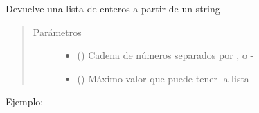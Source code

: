 \documentclass[a4paper,12pt,spanish]{sphinxmanual}
\begin{document}
\begin{fulllineitems}
\label{\detokenize{openerm.Utils:openerm.Utils.str_to_list}}
Devuelve una lista de enteros a partir de un string
\begin{quote}\begin{description}
\item[{Parámetros}] \leavevmode\begin{itemize}
\item {} 
 () \textendash{} Cadena de números separados por , o -

\item {} 
 () \textendash{} Máximo valor que puede tener la lista

\end{itemize}

\end{description}\end{quote}
\begin{description}
\item[{Ejemplo:}] \leavevmode
\begin{sphinxVerbatim}[commandchars=\\\{\}]
   
 
 
\end{sphinxVerbatim}

\end{description}

\end{fulllineitems}

\label{\detokenize{openerm.Config:config}}\label{\detokenize{openerm.Config:module-openerm.Config}}\label{\detokenize{openerm.Config:config}}
\end{document}
